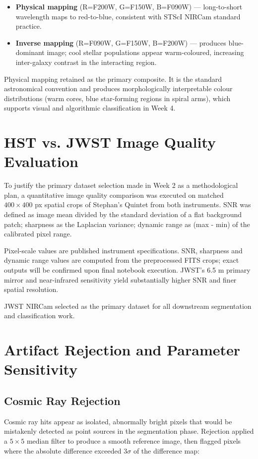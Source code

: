\documentclass[11pt]{article}
\begin{document}
\begin{itemize}
    \item \textbf{Physical mapping} (R=F200W, G=F150W, B=F090W) --- long-to-short wavelength maps to red-to-blue, consistent with STScI NIRCam standard practice.
    \item \textbf{Inverse mapping} (R=F090W, G=F150W, B=F200W) --- produces blue-dominant image; cool stellar populations appear warm-coloured, increasing inter-galaxy contrast in the interacting region.
\end{itemize}

Physical mapping retained as the primary composite. It is the standard astronomical convention and produces morphologically interpretable colour distributions (warm cores, blue star-forming regions in spiral arms), which supports visual and algorithmic classification in Week 4.

\section{HST vs. JWST Image Quality Evaluation}
To justify the primary dataset selection made in Week 2 as a methodological plan, a quantitative image quality comparison was executed on matched $400 \times 400$ px spatial crops of Stephan's Quintet from both instruments. SNR was defined as image mean divided by the standard deviation of a flat background patch; sharpness as the Laplacian variance; dynamic range as (max - min) of the calibrated pixel range.

Pixel-scale values are published instrument specifications. SNR, sharpness and dynamic range values are computed from the preprocessed FITS crops; exact outputs will be confirmed upon final notebook execution. JWST's 6.5 m primary mirror and near-infrared sensitivity yield substantially higher SNR and finer spatial resolution. 

JWST NIRCam selected as the primary dataset for all downstream segmentation and classification work.

\section{Artifact Rejection and Parameter Sensitivity}
\subsection{Cosmic Ray Rejection}
Cosmic ray hits appear as isolated, abnormally bright pixels that would be mistakenly detected as point sources in the segmentation phase. Rejection applied a $5 \times 5$ median filter to produce a smooth reference image, then flagged pixels where the absolute difference exceeded $3\sigma$ of the difference map:
\end{document}
